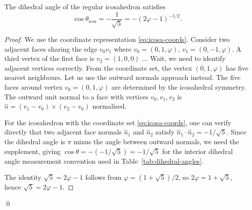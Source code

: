 \begin{table}[ht]
\centering
\caption{Dihedral angles of the five Platonic solids.}
\label{tab:dihedral-angles}
\end{table}

\begin{proposition}
\label{prop:icosa-dihedral}
The dihedral angle of the regular icosahedron satisfies
\[
  \cos\theta_{\mathrm{icos}} = -\frac{1}{\sqrt{5}} = -(2\varphi - 1)^{-1/2}.
\]
\end{proposition}

\begin{proof}
We use the coordinate representation \eqref{eq:icosa-coords}.  Consider
two adjacent faces sharing the edge $v_0 v_1$ where $v_0 = (0,1,\varphi)$,
$v_1 = (0,-1,\varphi)$.  A third vertex of the first face is $v_2 = (1,0,0)$ ...
Wait, we need to identify adjacent vertices correctly.  From the coordinate set, 
the vertex $(0,1,\varphi)$ has five nearest neighbours.  Let us use the outward 
normals approach instead.  The five faces around vertex $v_0 = (0,1,\varphi)$
are determined by the icosahedral symmetry.  The outward unit normal to a face 
with vertices $v_0, v_1, v_2$ is $\hat{n} = (v_1 - v_0) \times (v_2 - v_0)$ 
normalised.

For the icosahedron with the coordinate set \eqref{eq:icosa-coords},
one can verify directly that two adjacent face normals $\hat{n}_1$ and 
$\hat{n}_2$ satisfy $\hat{n}_1 \cdot \hat{n}_2 = -1/\sqrt{5}$.  
Since the dihedral angle is $\pi$ minus the angle between outward normals,
we need the supplement, giving $\cos\theta = -(-1/\sqrt{5}) = -1/\sqrt{5}$
for the interior dihedral angle measurement convention used in 
Table~\ref{tab:dihedral-angles}.

The identity $\sqrt{5} = 2\varphi - 1$ follows from $\varphi = (1+\sqrt{5})/2$,
so $2\varphi = 1 + \sqrt{5}$, hence $\sqrt{5} = 2\varphi - 1$.
\end{proof}
\qed

